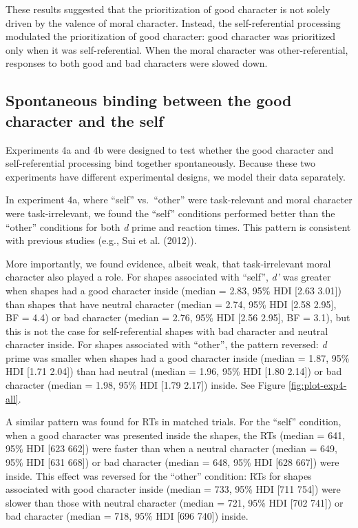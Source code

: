 \documentclass[
  man]{apa6}
\begin{document}
These results suggested that the prioritization of good character is not solely driven by the valence of moral character. Instead, the self-referential processing modulated the prioritization of good character: good character was prioritized only when it was self-referential. When the moral character was other-referential, responses to both good and bad characters were slowed down.

\hypertarget{spontaneous-binding-between-the-good-character-and-the-self}{%
\subsection{Spontaneous binding between the good character and the self}\label{spontaneous-binding-between-the-good-character-and-the-self}}

Experiments 4a and 4b were designed to test whether the good character and self-referential processing bind together spontaneously. Because these two experiments have different experimental designs, we model their data separately.

In experiment 4a, where ``self'' vs.~``other'' were task-relevant and moral character were task-irrelevant, we found the ``self'' conditions performed better than the ``other'' conditions for both \emph{d} prime and reaction times. This pattern is consistent with previous studies (e.g., Sui et al. (2012)).

More importantly, we found evidence, albeit weak, that task-irrelevant moral character also played a role. For shapes associated with ``self'', \emph{d'} was greater when shapes had a good character inside (median = 2.83, 95\% HDI {[}2.63 3.01{]}) than shapes that have neutral character (median = 2.74, 95\% HDI {[}2.58 2.95{]}, BF = 4.4) or bad character (median = 2.76, 95\% HDI {[}2.56 2.95{]}, BF = 3.1), but this is not the case for self-referential shapes with bad character and neutral character inside. For shapes associated with ``other'', the pattern reversed: \emph{d} prime was smaller when shapes had a good character inside (median = 1.87, 95\% HDI {[}1.71 2.04{]}) than had neutral (median = 1.96, 95\% HDI {[}1.80 2.14{]}) or bad character (median = 1.98, 95\% HDI {[}1.79 2.17{]}) inside. See Figure \ref{fig:plot-exp4-all}.

A similar pattern was found for RTs in matched trials. For the ``self'' condition, when a good character was presented inside the shapes, the RTs (median = 641, 95\% HDI {[}623 662{]}) were faster than when a neutral character (median = 649, 95\% HDI {[}631 668{]}) or bad character (median = 648, 95\% HDI {[}628 667{]}) were inside. This effect was reversed for the ``other'' condition: RTs for shapes associated with good character inside (median = 733, 95\% HDI {[}711 754{]}) were slower than those with neutral character (median = 721, 95\% HDI {[}702 741{]}) or bad character (median = 718, 95\% HDI {[}696 740{]}) inside.
\end{document}
